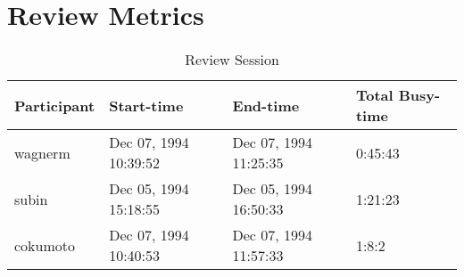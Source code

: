 \section{Review Metrics}
\begin{table}[hb]
\begin{center}
\begin{tabular}{|l|l|l|l|}
\hline
Participant & Start-time & End-time & Total Busy-time \\
\hline
wagnerm & Dec 07, 1994 10:39:52 & Dec 07, 1994 11:25:35 & 0:45:43 \\
subin & Dec 05, 1994 15:18:55 & Dec 05, 1994 16:50:33 & 1:21:23 \\
cokumoto & Dec 07, 1994 10:40:53 & Dec 07, 1994 11:57:33 & 1:8:2 \\
\hline
\end{tabular}
\end{center}
\caption{Review Session}
\end{table}


